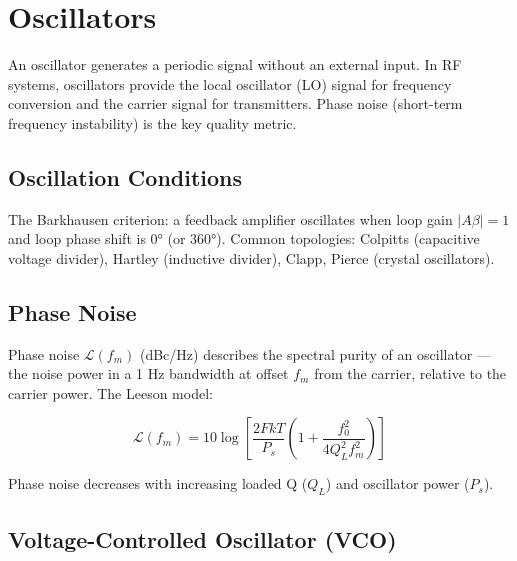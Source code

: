 \section{Oscillators}\label{sec:wiki_oscillators}



An oscillator generates a periodic signal without an external input. In RF systems, oscillators provide the local oscillator (LO) signal for frequency conversion and the carrier signal for transmitters. Phase noise (short-term frequency instability) is the key quality metric.

				

\subsection{Oscillation Conditions}

				

The Barkhausen criterion: a feedback amplifier oscillates when loop gain $|A\beta| = 1$ and loop phase shift is 0° (or 360°). Common topologies: Colpitts (capacitive voltage divider), Hartley (inductive divider), Clapp, Pierce (crystal oscillators).


				

\subsection{Phase Noise}

				

Phase noise $\mathcal{L}(f_m)$ (dBc/Hz) describes the spectral purity of an oscillator — the noise power in a 1 Hz bandwidth at offset $f_m$ from the carrier, relative to the carrier power. The Leeson model:

				
\[\mathcal{L}(f_m) = 10\log\left[\dfrac{2FkT}{P_s}\left(1+\dfrac{f_0^2}{4Q_L^2 f_m^2}\right)\right]\]

				

Phase noise decreases with increasing loaded Q ($Q_L$) and oscillator power ($P_s$).

				

\subsection{Voltage-Controlled Oscillator (VCO)}

